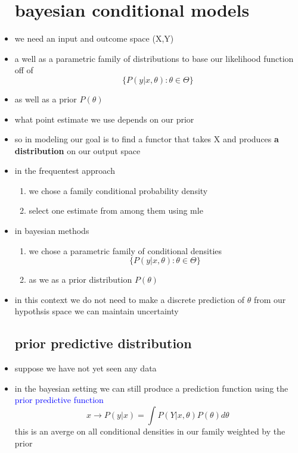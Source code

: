 \documentclass{article}
\begin{document}
\begin{itemize}
\section*{bayesian conditional models}
\item we need an input and outcome space (X,Y) 
\item a well as a parametric family of distributions to base our likelihood function off of $$\{P(y|x,\theta):\theta\in \Theta\}$$
\item as well as a prior $P(\theta)$  
\item what point estimate we use depends on our prior
\item so in modeling our goal is to find a functor that takes X and produces \textbf{a distribution} on our output space
\item in the frequentest approach 
\begin{enumerate}
    \item we chose a family conditional probability density
    \item select one estimate from among them using mle 
\end{enumerate}
\item in bayesian methods 
\begin{enumerate}
    \item we chose a parametric family of conditional densities $$\{P(y|x,\theta):\theta\in \Theta\}$$
    \item as we as a prior distribution $P(\theta)$
\end{enumerate}
\item in this context we do not need to make a discrete prediction of $\theta$ from our hypothsis space we can maintain uncertainty
\subsection*{prior predictive distribution}
\item suppose we have not yet seen any data 
\item in the bayesian setting we can still produce a prediction function using the \textcolor{blue}{prior predictive function} $$x\rightarrow P(y|x)= \int P(Y|x,\theta)P(\theta)d\theta$$ this is an averge on all conditional densities in our family weighted by the prior

\end{itemize}
\end{document}
